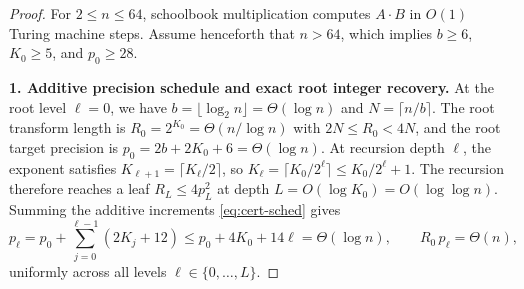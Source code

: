 \begin{proof}
For $2 \le n \le 64$, schoolbook multiplication computes $A \cdot B$ in $O(1)$ Turing machine steps. Assume henceforth that $n > 64$, which implies $b \ge 6$, $K_0 \ge 5$, and $p_0 \ge 28$.

\textbf{1. Additive precision schedule and exact root integer recovery.}
At the root level $\ell = 0$, we have $b = \lfloor \log_2 n \rfloor = \Theta(\log n)$ and $N = \lceil n / b \rceil$. The root transform length is $R_0 = 2^{K_0} = \Theta(n / \log n)$ with $2N \le R_0 < 4N$, and the root target precision is $p_0 = 2b + 2K_0 + 6 = \Theta(\log n)$. At recursion depth $\ell$, the exponent satisfies $K_{\ell+1} = \lceil K_\ell / 2 \rceil$, so $K_\ell = \lceil K_0 / 2^\ell \rceil \le K_0 / 2^\ell + 1$. The recursion therefore reaches a leaf $R_L \le 4 p_L^2$ at depth $L = O(\log K_0) = O(\log \log n)$. Summing the additive increments \eqref{eq:cert-sched} gives
\[
  p_\ell = p_0 + \sum_{j=0}^{\ell-1} (2 K_j + 12) \le p_0 + 4 K_0 + 14 \ell = \Theta(\log n), \qquad R_0 \, p_\ell = \Theta(n),
\]
uniformly across all levels $\ell \in \{0, \dots, L\}$.


\end{proof}
